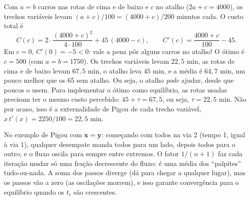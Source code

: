 \documentclass[11pt]{article}
\begin{document}
Com $a = b$ carros nas rotas de cima e de baixo e $c$ no atalho ($2a+c = 4000$), os trechos variáveis levam $(a+c)/100 = (4000+c)/200$ minutos cada. O custo total é
\[
C(c) = 2\cdot\frac{(4000+c)^2}{4\cdot100}+45\,(4000-c),\qquad C'(c) = \frac{4000+c}{100}-45.
\]
Em $c=0$, $C'(0) = -5<0$: vale a pena pôr alguns carros no atalho! O ótimo é $c = 500$ (com $a=b=1750$). Os trechos variáveis levam $22{,}5$ min, as rotas de cima e de baixo levam $67{,}5$ min, o atalho leva $45$ min, e a média é $64{,}7$ min, um pouco melhor que os 65 sem atalho. Ou seja, o atalho \emph{pode} ajudar, desde que poucos o usem. Para implementar o ótimo como equilíbrio, as rotas usadas precisam ter o mesmo custo percebido: $45+\tau = 67{,}5$, ou seja, $\tau = 22{,}5$ min. Não por acaso, isso é a externalidade de Pigou de cada trecho variável, $x\,t'(x) = 2250/100 = 22{,}5$ min.

No exemplo de Pigou com $\bm x = \bm y$: começando com todos na via 2 (tempo 1, igual à via 1), qualquer desempate manda todos para um lado, depois todos para o outro, e o fluxo oscila para sempre entre extremos. O fator $1/(n+1)$ faz cada iteração mudar só uma fração decrescente do fluxo: é uma média dos ``palpites'' tudo-ou-nada. A soma dos passos diverge (dá para chegar a qualquer lugar), mas os passos vão a zero (as oscilações morrem), e isso garante convergência para o equilíbrio quando os $t_e$ são crescentes.
\end{document}
